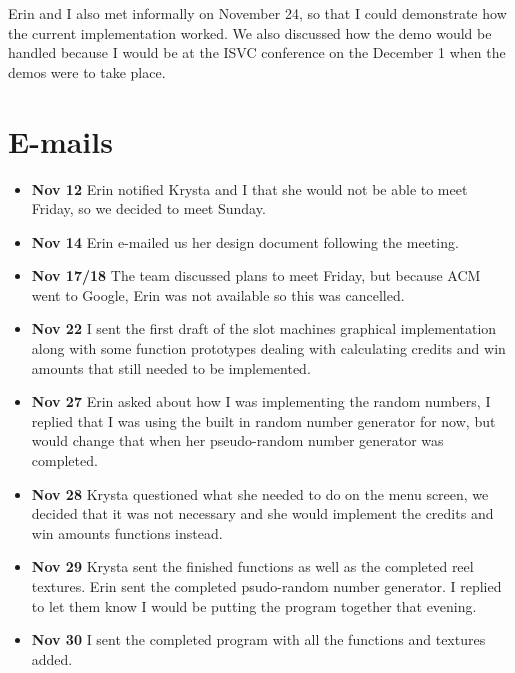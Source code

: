           Erin and I also met informally on November 24, so that I could demonstrate how the current implementation worked.  We also discussed how the demo would be handled because I would be at the ISVC conference on the December 1 when the demos were to take place.

\section{E-mails}
\begin{itemize}
\item
            {\bf Nov 12} Erin notified Krysta and I that she would not be able to meet Friday, so we decided to meet Sunday.
\item              {\bf Nov 14} Erin e-mailed us her design document following the meeting.
\item                {\bf Nov 17/18} The team discussed plans to meet Friday, but because ACM went to Google, Erin was not available so this was cancelled.
\item                  {\bf Nov 22} I sent the first draft of the slot machines graphical implementation along with some function prototypes dealing with calculating credits and win amounts that still needed to be implemented.
\item                    {\bf Nov 27} Erin asked about how I was implementing the random numbers, I replied that I was using the built in random number generator for now, but would change that when her pseudo-random number generator was completed.
\item                     {\bf Nov 28} Krysta questioned what she needed to do on the menu screen, we decided that it was not necessary and she would implement the credits and win amounts functions instead.
\item                        {\bf Nov 29} Krysta sent the finished functions as well as the completed reel textures. Erin sent the completed psudo-random number generator.  I replied to let them know I would be putting the program together that evening.
\item                          {\bf Nov 30} I sent the completed program with all the functions and textures added.

\end{itemize}
